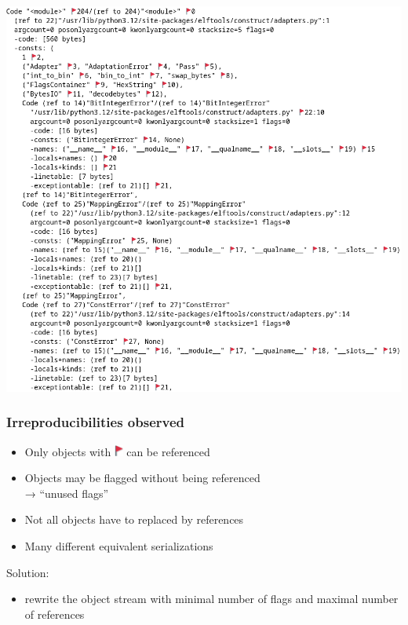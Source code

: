 \documentclass[]{beamer}
\newcommand{\flag}{\includegraphics[height=1em]{images/flag.png}}
\begin{document}
\begin{frame}
  \includegraphics[width=\textwidth]{images/pyc-dump.png}
\end{frame}

\begin{frame}
  \frametitle{Irreproducibilities observed}

  \begin{itemize}
  \pause
  \item Only objects with \flag{} can be referenced

  \pause
  \item Objects may be flagged without being referenced\\
    → ``unused flags''

  \pause
  \item Not all objects have to replaced by references

  \pause
  \item Many different equivalent serializations
  \end{itemize}

  \vfill
  \pause

  Solution:\\\pause
  \begin{itemize}
  \item rewrite the object stream with minimal number of flags and maximal number of references
  \end{itemize}
\end{frame}
\end{document}
